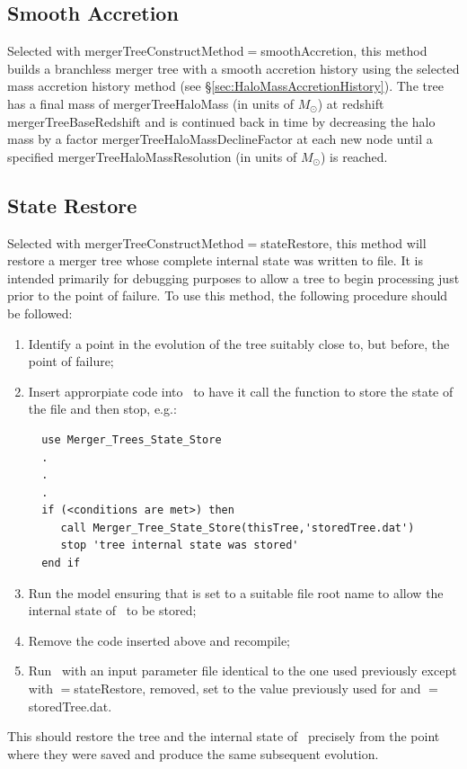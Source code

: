 \subsection{Smooth Accretion}\label{sec:SmoothAccretion}

Selected with {\normalfont \ttfamily mergerTreeConstructMethod}$=${\normalfont \ttfamily smoothAccretion}, this method builds a branchless merger tree with a smooth accretion history using the selected mass accretion history method (see \S\ref{sec:HaloMassAccretionHistory}). The tree has a final mass of {\normalfont \ttfamily mergerTreeHaloMass} (in units of $M_\odot$) at redshift {\normalfont \ttfamily mergerTreeBaseRedshift} and is continued back in time by decreasing the halo mass by a factor {\normalfont \ttfamily mergerTreeHaloMassDeclineFactor} at each new \gls{node} until a specified {\normalfont \ttfamily mergerTreeHaloMassResolution} (in units of $M_\odot$) is reached.

\subsection{State Restore}\label{sec:TreeConstructStateRestore}

Selected with {\normalfont \ttfamily mergerTreeConstructMethod}$=${\normalfont \ttfamily stateRestore}, this method will restore a merger tree whose complete internal state was written to file. It is intended primarily for debugging purposes to allow a tree to begin processing just prior to the point of failure. To use this method, the following procedure should be followed:
\begin{enumerate}
 \item Identify a point in the evolution of the tree suitably close to, but before, the point of failure;
 \item Insert approrpiate code into \glc\ to have it call the function to store the state of the file and then stop, e.g.:
 \begin{verbatim}
  use Merger_Trees_State_Store
  .
  .
  .
  if (<conditions are met>) then
     call Merger_Tree_State_Store(thisTree,'storedTree.dat')
     stop 'tree internal state was stored'
  end if
 \end{verbatim}
 \item Run the model ensuring that {\normalfont \ttfamily [stateFileRoot]} is set to a suitable file root name to allow the internal state of \glc\ to be stored;
 \item Remove the code inserted above and recompile;
 \item Run \glc\ with an input parameter file identical to the one used previously except with {\normalfont \ttfamily [mergerTreeConstructMethod]}$=${\normalfont \ttfamily stateRestore}, {\normalfont \ttfamily [stateFileRoot]} removed, {\normalfont \ttfamily [stateRetrieveFileRoot]} set to the value previously used for {\normalfont \ttfamily [stateFileRoot]} and {\normalfont \ttfamily [mergerTreeStateStoreFile]}$=${\normalfont \ttfamily storedTree.dat}.
\end{enumerate}
This should restore the tree and the internal state of \glc\ precisely from the point where they were saved and produce the same subsequent evolution.

